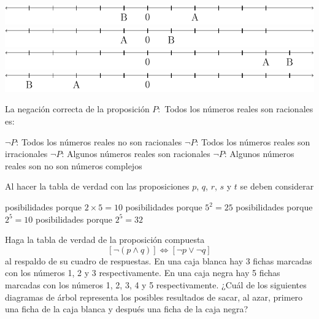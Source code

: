 \documentclass[10pt,letterpaper,addpoints]{exam}
\begin{document}
\begin{multicols}{2}
\begin{questions}
\begin{choices}
\CorrectChoice \includegraphics[scale=.5]{Images/respA.pdf} 
\choice \includegraphics[scale=.5]{Images/respB.pdf} 
\choice \includegraphics[scale=.5]{Images/respC.pdf} 
\choice \includegraphics[scale=.5]{Images/respD.pdf} 
  \end{choices}
  \question
  La negación correcta de la proposición $P:$ Todos los números reales son racionales es:
  \begin{choices}
  \choice $\neg P$: Todos los números reales no son racionales
  \choice $\neg P$: Todos los números reales son irracionales
  \CorrectChoice $\neg P$: Algunos números reales son racionales
  \choice $\neg P$: Algunos números reales son no son números complejos 
\end{choices}  
\question Al hacer la tabla de verdad con las proposiciones $p$, $q$, $r$, $s$ y $t$ se deben considerar
\begin{choices}
 posibilidades porque $2\times 5=10$
 posibilidades porque $5^{2}=25$
 posibilidades porque $2^{5}=10$
 posibilidades porque $2^{5}=32$
\end{choices}
\question Haga la tabla de verdad de la proposición compuesta 
\[[\neg(p\wedge q)]\Longleftrightarrow [\neg p \vee \neg q]\]
al respaldo de su cuadro de respuestas.
\question En una caja blanca hay 3 fichas marcadas con los números 1, 2 y 3 respectivamente. En una caja negra hay 5 fichas marcadas con los números 1, 2, 3, 4 y 5 respectivamente. ¿Cuál de los siguientes diagramas de árbol representa los posibles resultados de sacar, al
azar, primero una ficha de la caja blanca y después una ficha de la caja negra?

\end{questions}
\end{multicols}
\end{document}
